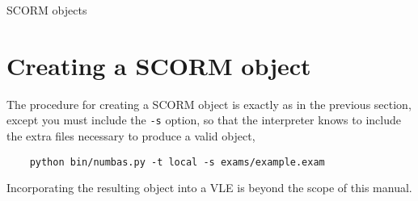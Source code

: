 \begin{chapter}{\label{cha:scorm}SCORM objects}
  \section{Creating a SCORM object}
  The procedure for creating a SCORM object is exactly as in the previous
  section, except you must include the \verb"-s" option, so that the
  interpreter knows to include the extra files necessary to produce a valid
  object, \eg
  \begin{Verbatim}
    python bin/numbas.py -t local -s exams/example.exam
  \end{Verbatim}
  Incorporating the resulting object into a VLE is beyond the scope of this
  manual.

\end{chapter}

